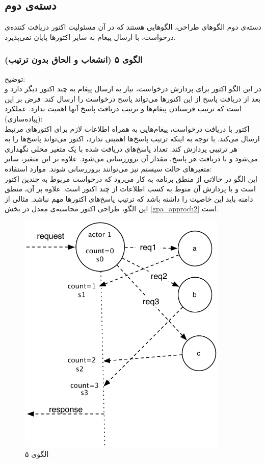 \subsection{دسته‌ی دوم}
دسته‌ی دوم الگوهای طراحی، الگوهایی هستند که در آن مسئولیت اکتور دریافت کننده‌ی درخواست، با ارسال‌ پیغام به سایر اکتورها پایان نمی‌پذیرد.

\subsubsection{الگوی ۵ (انشعاب و الحاق بدون ترتیب)}
توضیح:\\
در این الگو اکتور برای پردازش درخواست، نیاز به ارسال پیغام به چند اکتور دیگر دارد و بعد از دریافت پاسخ از این اکتورها می‌تواند پاسخ درخواست را ارسال کند. فرض بر این است که ترتیب فرستادن پیغام‌ها و ترتیب دریافت پاسخ‌ آنها اهمیت ندارد.
عملکرد (پیاده‌سازی):\\

اکتور با دریافت درخواست، پیغام‌هایی به همراه اطلاعات لازم برای اکتورهای مرتبط ارسال می‌کند. با توجه به اینکه ترتیب پاسخ‌ها اهمیتی ندارد، اکتور می‌تواند پاسخ‌ها را به هر ترتیبی پردازش کند. تعداد پاسخ‌های دریافت شده با یک متغیر محلی نگهداری می‌شود و با دریافت هر پاسخ، مقدار آن بروزرسانی می‌شود. علاوه بر این متغیر، سایر متغیرهای حالت سیستم نیز می‌توانند بروزرسانی شوند.
موارد استفاده:\\
این الگو در حالاتی از منطق برنامه به کار می‌رود که درخواست مربوط به چندین اکتور است و یا پردازش آن منوط به کسب اطلاعات از چند اکتور است. علاوه بر آن، منطق دامنه باید این خاصیت را داشته باشد که ترتیب پاسخ‌های اکتورها مهم نباشد. مثالی از این الگو، طراحی اکتور محاسبه‌ی معدل در بخش \ref{gpa_approch2} است.
\begin{figure}[hb]
    \begin{center}
	\includegraphics[width=10cm]{4-ProposedFramework/Figures/Patterns_statelfull_fj.pdf}
    \end{center}
    \caption{\label{fig:Patterns_statefull_5}الگوی ۵}
\end{figure}


